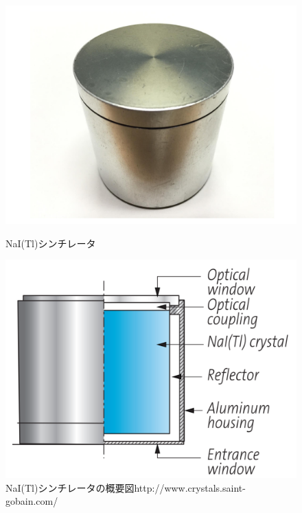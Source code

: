 \begin{figure}[htbp]
\begin{minipage}{0.5\hsize}
\centering
\includegraphics[keepaspectratio,scale=0.35]{fig/ybm/naitl.pdf}
\caption{NaI(Tl)シンチレータ}
\label{fig:naitl}
\end{minipage}
\begin{minipage}{0.5\hsize}
\centering
\includegraphics[keepaspectratio,scale=0.35]{fig/ybm/naitl0.pdf}
\caption{NaI(Tl)シンチレータの概要図\newline[ref]http://www.crystals.saint-gobain.com/}
\label{fig:naitl0}
\end{minipage}
\end{figure}

